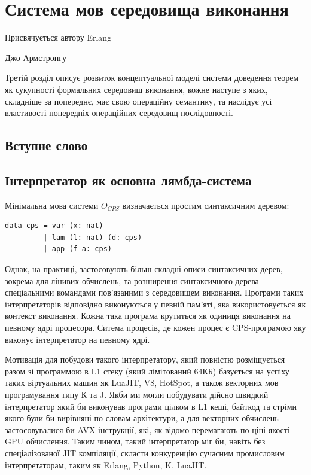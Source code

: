 \chapter{Система мов середовища виконання}
\epigraph{Присвячується автору Erlang}{Джо Армстронгу}

Третій розділ описує розвиток концептуальної моделі системи доведення теорем як сукупності
формальних середовищ виконання, кожне наступе з яких, складніше за попереднє,
має свою операційну семантику, та наслідує усі властивості попередніх операційних середовищ послідовності.

\section*{Вступне слово}

\section{Інтерпретатор як основна лямбда-система}

Мінімальна мова системи $O_{CPS}$ визначається простим
синтаксичним деревом:

\begin{lstlisting}
data cps = var (x: nat)
         | lam (l: nat) (d: cps)
         | app (f a: cps)
\end{lstlisting}

Однак, на практиці, застосовують більш складні описи синтаксичних дерев,
зокрема для лінивих обчислень, та розширення синтаксичного дерева спеціальними
командами пов'язаними з середовищем виконання. Програми таких
інтерпретаторів відповідно виконуються у певній пам'яті, яка
використовується як контекст виконання. Кожна така програма крутиться
як одиниця виконання на певному ядрі процесора. Ситема процесів, де
кожен процес є CPS-програмою яку виконує інтерпретатор на певному ядрі.

Мотивація для побудови такого інтерпретатору, який повністю розміщується
разом зі программою в L1 стеку (який лімітований 64КБ) базується на успіху
таких віртуальних машин як LuaJIT, V8, HotSpot, а також векторних мов
програмування типу К та J. Якби ми могли побудувати дійсно швидкий інтерпретатор
який би виконував програми цілком в L1 кеші, байткод та стріми якого були би
вирівняні по словам архітектури, а для векторних обчислень застосовувалися би AVX інструкції,
які, як відомо перемагають по ціні-якості GPU обчислення. Таким чином, такий
інтерпретатор міг би, навіть без спеціалізованої JIT компіляції, скласти
конкуренцію сучасним промисловим інтерпретаторам, таким як Erlang, Python, K, LuaJIT.

